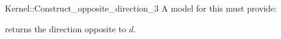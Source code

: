 \begin{ccRefFunctionObjectConcept}{Kernel::Construct_opposite_direction_3}
A model for this must provide:


 {returns the direction opposite to $d$.}

\end{ccRefFunctionObjectConcept}
